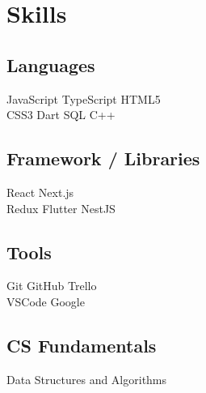 \documentclass[]{deedy-resume-openfont}
\begin{document}
%
%
\lastupdated

%
%

%
%

\begin{minipage}[t]{0.28\textwidth} 



\section{Skills}
\subsection{Languages}

\textbullet JavaScript \textbullet TypeScript  \textbullet{} HTML5 \\ \textbullet CSS3 \textbullet{} Dart \textbullet SQL \textbullet{} C++ 
\sectionsep

\subsection{Framework / Libraries}
 \textbullet React \textbullet{}   Next.js\\ \textbullet{} Redux 
  \textbullet{} Flutter \textbullet{} NestJS
\sectionsep
\subsection{Tools}
 \textbullet Git \textbullet{}   GitHub \textbullet{} Trello\\ \textbullet{} VSCode  \textbullet{} Google 
\sectionsep
 \subsection{CS Fundamentals}
 \textbullet{}   Data Structures and Algorithms \\   \\ 
\sectionsep


\end{minipage}
\end{document}

